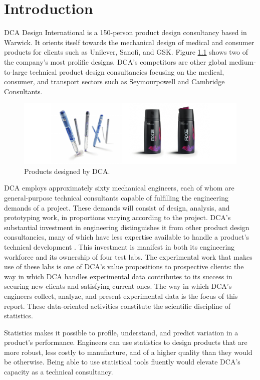 \documentclass[11pt,a4paper,article]{memoir} %
\begin{document}
\chapter{Introduction}
DCA Design International is a 150-person product design consultancy based in Warwick. It orients itself towards the mechanical design of medical and consumer products for clients such as Unilever, Sanofi, and GSK. Figure \ref{fig:dca_profile} shows two of the company's most prolific designs. DCA's competitors are other global medium-to-large technical product design consultancies focusing on the medical, consumer, and transport sectors such as Seymourpowell and Cambridge Consultants.
\par
\begin{figure}[b]
\includegraphics[width=\textwidth]{DCA_profile.pdf}
\caption{Products designed by DCA.}
\label{fig:dca_profile}
\end{figure}
\par
DCA employs approximately sixty mechanical engineers, each of whom are general-purpose technical consultants capable of fulfilling the engineering demands of a project. These demands will consist of design, analysis, and prototyping work, in proportions varying according to the project. DCA's substantial investment in engineering distinguishes it from other product design consultancies, many of which have less expertise available to handle a product's technical development \cite{designweek}. This investment is manifest in both its engineering workforce and its ownership of four test labs. The experimental work that makes use of these labs is one of DCA's value propositions to prospective clients: the way in which DCA handles experimental data contributes to its success in securing new clients and satisfying current ones. The way in which DCA's engineers collect, analyze, and present experimental data is the focus of this report. These data-oriented activities constitute the scientific discipline of statistics.
\par
Statistics makes it possible to profile, understand, and predict variation in a product's performance. Engineers can use statistics to design products that are more robust, less costly to manufacture, and of a higher quality than they would be otherwise. Being able to use statistical tools fluently would elevate DCA's capacity as a technical consultancy.
\end{document}
